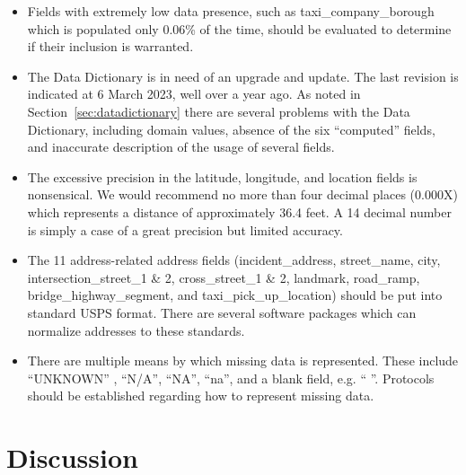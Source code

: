 \documentclass[12pt, titlepage]{article}
\begin{document}
\begin{itemize}
	\item Fields with extremely low data presence, such as taxi\_company\_borough 
	which is populated only 0.06\% of the time, should be evaluated 
	to determine if their inclusion is warranted.
	
	\item The Data Dictionary is in need of an upgrade and update. The last 
	revision is indicated at 6 March 2023, well over a year ago. 	As noted 
	in Section~\ref{sec:datadictionary} there are several problems 
	with the Data Dictionary, including domain values, absence of 
	the six ``computed'' fields, and inaccurate description of the usage of 
	several fields.
	
	\item The excessive precision in the latitude, longitude, and location 
	fields is  nonsensical.  We would recommend no more than 
	four decimal places (0.000X) which represents a distance of approximately 
	36.4 feet. A 14 decimal number is simply a case of a great 
	precision but limited accuracy.

	\item The 11 address-related address fields (incident\_address, 
	street\_name, city, intersection\_street\_1 \& 2, cross\_street\_1 \& 2,  
	landmark, road\_ramp, bridge\_highway\_segment, and 
	taxi\_pick\_up\_location) should be put into standard USPS format. There 
	are several software packages which can normalize addresses to 
	these standards.
	
	\item There are multiple means by which missing data is 
	represented. These include ``UNKNOWN'' , ``N/A'', ``NA'', ``na'', and 
	a blank field, e.g. `` ''. Protocols should be established 
	regarding how to represent missing data.
\end{itemize}






\section{Discussion} \label{sec:discussion}



\end{document}

